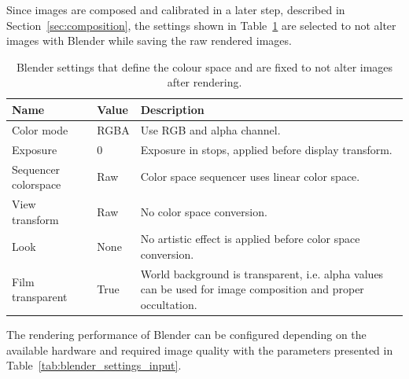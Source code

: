 Since images are composed and calibrated in a later step, described in Section~\ref{sec:composition}, the settings shown in Table~\ref{tab:color_space} are selected to not alter images with Blender while saving the raw rendered images.
\begin{table}[htb]
    \centering
    \caption{Blender settings that define the colour space and are fixed to not alter images after rendering.}
    \label{tab:color_space}
    \begin{tabular}{p{}|p{}|p{}}
        \textbf{Name}        & \textbf{Value} & \textbf{Description} \\ \hline
        Color mode           & RGBA           & Use RGB and alpha channel. \\
        Exposure             & 0              & Exposure in stops, applied before display transform. \\
        Sequencer colorspace & Raw            & Color space sequencer uses linear color space. \\
        View transform       & Raw            & No color space conversion. \\
        Look                 & None           & No artistic effect is applied before color space conversion. \\
        Film transparent     & True           & World background is transparent, i.e. alpha values can be used for image composition and proper occultation.
    \end{tabular}
\end{table}

The rendering performance of Blender can be configured depending on the available hardware and required image quality with the parameters presented in Table~\ref{tab:blender_settings_input}.
\begin{table}[htb]
    \centering
    \caption{Blender settings that affect performance and image quality.}
    \label{tab:blender_settings_input}
\end{table}

